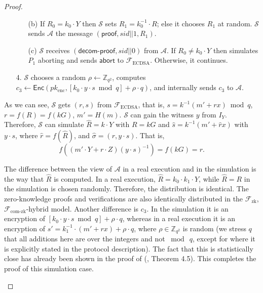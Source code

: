 \documentclass{llncs}
\begin{document}
\begin{proof}
\begin{trivlist}
\begin{itemize}
\begin{itemize}
\item[(b)] If $R_0 =k_0\cdot Y$ then $\mathcal{S}$ sets $R_1 =k_0^{-1}\cdot R$; else it chooses $R_1$ at random. $\mathcal{S}$ sends $\mathcal{A}$ the message $(\mathsf{proof}, sid||1, R_1)$.

\item[(c)] $\mathcal{S}$ receives $(\mathsf{decom\text{-}proof}, sid||0)$ from $\mathcal{A}$. If $R_0 \not= k_0 \cdot Y$ then simulates $P_1$ aborting and sends $\mathsf{abort}$ to $\mathcal{F}_{\text{ECDSA}}$. Otherwise, it continues.

\end{itemize} 
\item[4.] $\mathcal{S}$ chooses a random $\rho \leftarrow \mathbb{Z}_{q^2}$, computes $c_3 \leftarrow \mathsf{Enc}(pk_{\text{enc}},[k_0\cdot y\cdot s \bmod q]+\rho\cdot q)$, and internally sends $c_3$ to $\mathcal{A}$.

\end{itemize}
As we can see, $\mathcal{S}$ gets $(r,s)$ from $\mathcal{F}_{\text{ECDSA}}$, that is, $s=k^{-1}(m'+rx)\bmod q$, $r=f(R)=f(kG)$, $m'=H(m)$. $\mathcal{S}$ can gain the witness $y$ from $I_Y$. Therefore, $\mathcal{S}$ can simulate $\hat{R}=k\cdot Y$ with $R=kG$ and $\hat{s}=k^{-1}(m'+\hat{r}x)$ with $y\cdot s$, where $\hat{r}=f(\hat{R})$, and $\hat{\sigma}=(r,y\cdot s)$. That is, 
$$f((m'\cdot Y+r\cdot Z)(y\cdot s)^{-1})=f(kG)=r.$$

The difference between the view of $\mathcal{A}$ in a real execution and in the simulation is the way that $\hat{R}$ is computed. In a real execution, $\hat{R}=k_0\cdot k_1 \cdot Y$, while $\hat{R}=R$ in the simulation is chosen randomly. Therefore, the distribution is identical. The zero-knowledge proofs and verifications are also identically distributed in the $\mathcal{F}_{\text{zk}}$,$\mathcal{F}_{\text{com-zk}}$-hybrid model. Another difference is $c_3$. In the simulation it is an encryption of $[k_0\cdot y\cdot s \bmod q]+\rho\cdot q$, whereas in a real execution it is an encryption of $s' = k_1^{-1}\cdot (m' +rx)+\rho \cdot q$, where $\rho \in \mathbb{Z}_{q^2}$ is random (we stress $q$ that all additions here are over the integers and not $\bmod\ q$, except for where it is explicitly stated in the protocol description). The fact that this is statistically close has already been shown in the proof of (\cite{Lin17}, Theorem 4.5). This completes the proof of this simulation case.
\end{trivlist}


\end{proof}
\end{document}
